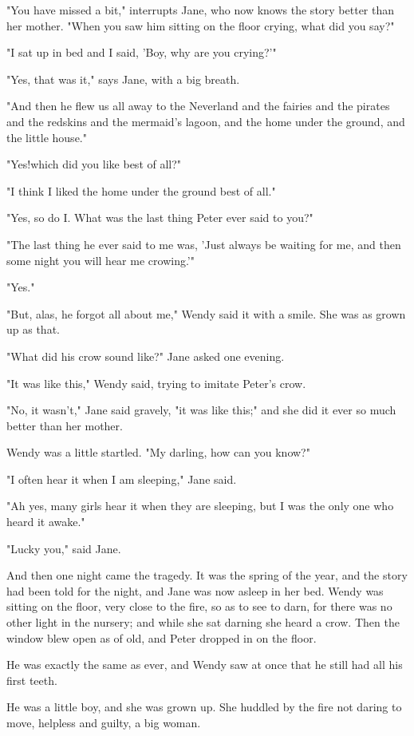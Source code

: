 "You have missed a bit," interrupts Jane, who now knows the story better than her mother.
"When you saw him sitting on the floor crying, what did you say?"

"I sat up in bed and I said, 'Boy, why are you crying?'"

"Yes, that was it," says Jane, with a big breath.

"And then he flew us all away to the Neverland and the fairies and the pirates and the redskins and the mermaid's lagoon, and the home under the ground, and the little house."

"Yes!\@ which did you like best of all?"

"I think I liked the home under the ground best of all."

"Yes, so do I\@.
What was the last thing Peter ever said to you?"

"The last thing he ever said to me was, 'Just always be waiting for me, and then some night you will hear me crowing.'"

"Yes."

"But, alas, he forgot all about me," Wendy said it with a smile.
She was as grown up as that.

"What did his crow sound like?\@" Jane asked one evening.

"It was like this," Wendy said, trying to imitate Peter's crow.

"No, it wasn't," Jane said gravely, "it was like this;" and she did it ever so much better than her mother.

Wendy was a little startled.
"My darling, how can you know?"

"I often hear it when I am sleeping," Jane said.

"Ah yes, many girls hear it when they are sleeping, but I was the only one who heard it awake."

"Lucky you," said Jane.

And then one night came the tragedy.
It was the spring of the year, and the story had been told for the night, and Jane was now asleep in her bed.
Wendy was sitting on the floor, very close to the fire, so as to see to darn, for there was no other light in the nursery;
and while she sat darning she heard a crow.
Then the window blew open as of old, and Peter dropped in on the floor.

He was exactly the same as ever, and Wendy saw at once that he still had all his first teeth.

He was a little boy, and she was grown up.
She huddled by the fire not daring to move, helpless and guilty, a big woman.

